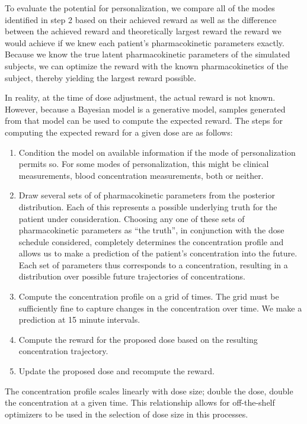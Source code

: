 To evaluate the potential for personalization, we compare all of the modes identified in step 2 based on their achieved reward as well as the difference between the achieved reward and theoretically largest reward the reward we would achieve if we knew each patient's pharmacokinetic parameters exactly. Because we know the true latent pharmacokinetic parameters of the simulated subjects, we can optimize the reward with the known pharmacokinetics of the subject, thereby yielding the largest reward possible.

In reality, at the time of dose adjustment, the actual reward is not known.  However, because a Bayesian model is a generative model, samples generated from that model can be used to compute the expected reward.  The steps for computing the expected reward for a given dose are as follows:

\begin{enumerate}
	\item Condition the model on available information if the mode of personalization permits so.  For some modes of personalization, this might be clinical measurements, blood concentration measurements, both or neither.
	
	\item Draw several sets of of pharmacokinetic parameters from the posterior distribution. Each of this represents a possible underlying truth for the patient  under consideration. Choosing any one of these sets of pharmacokinetic parameters as ``the truth'', in conjunction with the dose schedule considered, completely determines the concentration profile and allows us to make a prediction of the patient's concentration into the future. Each set of parameters thus corresponds to a concentration, resulting in a distribution over possible future trajectories of concentrations.
	
	\item Compute the concentration profile on a grid of times.  The grid must be sufficiently fine to capture changes in the concentration over time.  We make a prediction at 15 minute intervals.
	
	\item Compute the reward for the proposed dose based on the resulting concentration trajectory.
	
	\item Update the proposed dose and recompute the reward.
\end{enumerate}


The concentration profile scales linearly with dose size; double the dose, double the concentration at a given time.  This relationship allows for off-the-shelf optimizers to be used in the selection of dose size in this processes.
